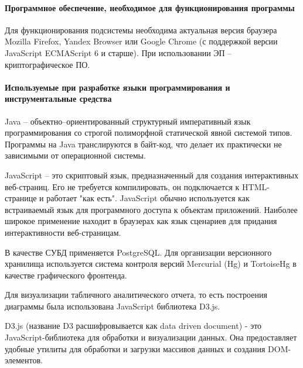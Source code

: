 \documentclass[a4paper]{extarticle}
\numberwithin{equation}{section}
\begin{document}
\paragraph{Программное обеспечение, необходимое для функционирования программы}
Для функционирования подсистемы необходима актуальная версия браузера Mozilla Firefox, Yandex Browser или Google Chrome (с поддержкой версии JavaScript ECMAScript 6 и старше). При использовании ЭП – криптографическое ПО.

\paragraph{Используемые при разработке языки программирования и инструментальные средства}
Java – объектно–ориентированный структурный императивный язык программирования со строгой полиморфной статической явной системой типов. Программы на Java транслируются в байт-код, что делает их практически не зависимыми от операционной системы.\par
JavaScript – это скриптовый язык, предназначенный для создания интерактивных веб-страниц. Его не требуется компилировать, он подключается к HTML-странице и работает "как есть". JavaScript обычно используется как встраиваемый язык для программного доступа к объектам приложений. Наиболее широкое применение находит в браузерах как язык сценариев для придания интерактивности веб-страницам.\par
В качестве СУБД применяется PostgreSQL. Для организации версионного хранилища используется система контроля версий Mercurial (Hg) и TortoiseHg в качестве графического фронтенда.\par
Для визуализации табличного аналитического отчета, то есть построения диаграммы была использована JavaScript библиотека D3.js.\par
D3.js (название D3 расшифровывается как data driven document) - это JavaScript-библиотека для обработки и визуализации данных. Она предоставляет удобные утилиты для обработки и загрузки массивов данных и создания DOM-элементов.
\end{document}
